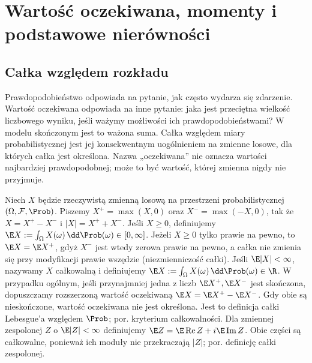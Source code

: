 \chapter{Wartość oczekiwana, momenty i podstawowe nierówności}
\label{ch:expectation}

\providecommand{\atlasref}[2]{#2}

\section{Całka względem rozkładu}
Prawdopodobieństwo odpowiada na pytanie, jak często wydarza się
zdarzenie. Wartość oczekiwana odpowiada na inne pytanie:
jaka jest przeciętna wielkość liczbowego wyniku, jeśli ważymy
możliwości ich prawdopodobieństwami? W modelu skończonym jest
to ważona suma. Całka względem miary probabilistycznej jest
jej konsekwentnym uogólnieniem na zmienne losowe, dla których
całka jest określona.
Nazwa „oczekiwana” nie oznacza wartości najbardziej prawdopodobnej;
może to być wartość, której zmienna nigdy nie przyjmuje.

\begin{definicja}
Niech $X$ będzie rzeczywistą zmienną losową na przestrzeni
probabilistycznej $(\Omega,\mathcal F,\Prob)$. Piszemy
$X^+=\max(X,0)$ oraz $X^-=\max(-X,0)$, tak że
$X=X^+-X^-$ i $|X|=X^++X^-$.
Jeśli $X\geq0$, definiujemy
$\E X:=\int_\Omega X(\omega)\,\dd\Prob(\omega)\in[0,\infty]$.
Jeżeli $X\geq0$ tylko prawie na pewno, to $\E X=\E X^+$,
gdyż $X^-$ jest wtedy zerowa prawie na pewno, a całka
nie zmienia się przy modyfikacji prawie wszędzie
(\atlasref{ME-07::thm:ae-integral-invariance}{niezmienniczość całki}).
Jeśli $\E|X|<\infty$, nazywamy $X$ całkowalną i definiujemy
$\E X:=\int_\Omega X(\omega)\,\dd\Prob(\omega)\in\R$.
W przypadku ogólnym, jeśli przynajmniej jedna z liczb $\E X^+,\E X^-$ jest
skończona, dopuszczamy rozszerzoną wartość oczekiwaną
$\E X=\E X^+-\E X^-$. Gdy obie są nieskończone,
wartość oczekiwana nie jest określona.
Jest to definicja całki Lebesgue'a względem $\Prob$;
por. \atlasref{ME-07::thm:integrability-criterion}{kryterium całkowalności}.
Dla zmiennej zespolonej $Z$ o $\E|Z|<\infty$ definiujemy
$\E Z=\E\operatorname{Re}Z+i\E\operatorname{Im}Z$.
Obie części są całkowalne, ponieważ ich moduły nie przekraczają
$|Z|$; por. \atlasref{ME-08::def:complex-integral}{definicję całki zespolonej}.
\end{definicja}

